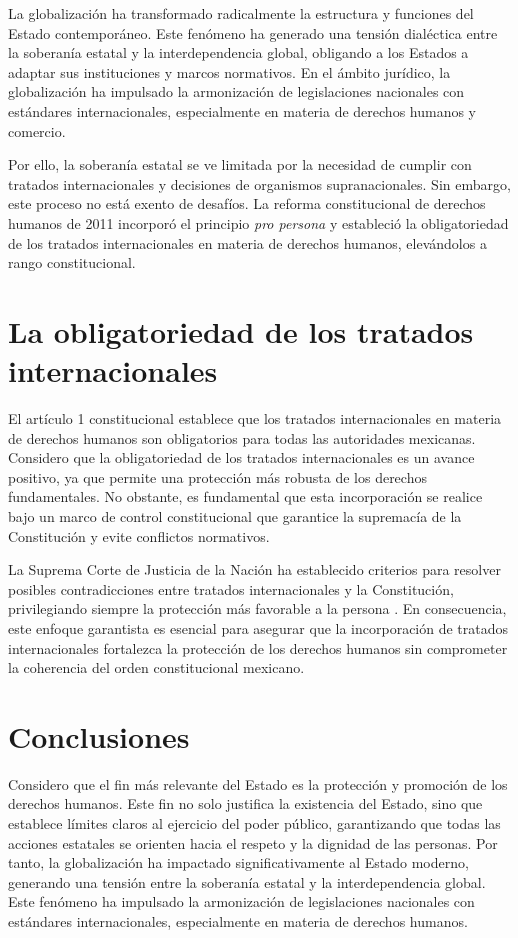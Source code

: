 \documentclass[12pt,spanish,letterpaper,oneside]{article}
\begin{document}
La globalizaci\'on ha transformado radicalmente la estructura y funciones del Estado contempor\'aneo. Este fen\'omeno ha generado una tensi\'on dial\'ectica entre la soberan\'ia estatal y la interdependencia global, obligando a los Estados a adaptar sus instituciones y marcos normativos. En el \'ambito jur\'idico, la globalizaci\'on ha impulsado la armonizaci\'on de legislaciones nacionales con est\'andares internacionales, especialmente en materia de derechos humanos y comercio.

Por ello, la soberan\'ia estatal se ve limitada por la necesidad de cumplir con tratados internacionales y decisiones de organismos supranacionales. Sin embargo, este proceso no est\'a exento de desaf\'ios. La reforma constitucional de derechos humanos de 2011 incorpor\'o el principio \emph{pro persona} y estableci\'o la obligatoriedad de los tratados internacionales en materia de derechos humanos, elev\'andolos a rango constitucional.

\section{La obligatoriedad de los tratados internacionales}

El art\'iculo 1\textdegree{} constitucional establece que los tratados internacionales en materia de derechos humanos son obligatorios para todas las autoridades mexicanas. Considero que la obligatoriedad de los tratados internacionales es un avance positivo, ya que permite una protecci\'on m\'as robusta de los derechos fundamentales. No obstante, es fundamental que esta incorporaci\'on se realice bajo un marco de control constitucional que garantice la supremac\'ia de la Constituci\'on y evite conflictos normativos.

La Suprema Corte de Justicia de la Naci\'on ha establecido criterios para resolver posibles contradicciones entre tratados internacionales y la Constituci\'on, privilegiando siempre la protecci\'on m\'as favorable a la persona \citep{scjn2011}. En consecuencia, este enfoque garantista es esencial para asegurar que la incorporaci\'on de tratados internacionales fortalezca la protecci\'on de los derechos humanos sin comprometer la coherencia del orden constitucional mexicano.

\clearpage
\section{Conclusiones}

Considero que el fin m\'as relevante del Estado es la protecci\'on y promoci\'on de los derechos humanos. Este fin no solo justifica la existencia del Estado, sino que establece l\'imites claros al ejercicio del poder p\'ublico, garantizando que todas las acciones estatales se orienten hacia el respeto y la dignidad de las personas. Por tanto, la globalizaci\'on ha impactado significativamente al Estado moderno, generando una tensi\'on entre la soberan\'ia estatal y la interdependencia global. Este fen\'omeno ha impulsado la armonizaci\'on de legislaciones nacionales con est\'andares internacionales, especialmente en materia de derechos humanos.
\end{document}
